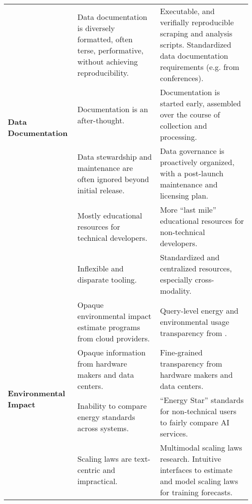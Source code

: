 \begin{table*}[t!]
\begin{adjustbox}{width=\textwidth}
\begin{tabular}{m{2.5cm} m{7cm} m{7cm}}

\midrule
\multirow{4}{*}{\textbf{Data Documentation}} & Data documentation is diversely formatted, often terse, performative, without achieving reproducibility. & Executable, and verifially reproducible scraping and analysis scripts. Standardized data documentation requirements (e.g. from conferences). \\
& Documentation is an after-thought. & Documentation is started early, assembled over the course of collection and processing. \\
& Data stewardship and maintenance are often ignored beyond initial release. & Data governance is proactively organized, with a post-launch maintenance and licensing plan. \\

\midrule

\multirow{2}{*}{\textbf{Model Training}} & Mostly educational resources for technical developers. & More ``last mile'' educational resources for non-technical developers.\\
& Inflexible and disparate tooling. & Standardized and centralized resources, especially cross-modality. \\

\midrule

\multirow{6}{*}{\textbf{Environmental Impact}} & Opaque environmental impact estimate programs from cloud providers. & Query-level energy and environmental usage transparency from . \\
& Opaque information from hardware makers and data centers. & Fine-grained transparency from hardware makers and data centers. \\
& Inability to compare energy standards across systems. & ``Energy Star'' standards for non-technical users to fairly compare AI services. \\
& Scaling laws are text-centric and impractical. & Multimodal scaling laws research. Intuitive interfaces to estimate and model scaling laws for training forecasts. \\


\end{tabular}
\end{adjustbox}
\end{table*}
